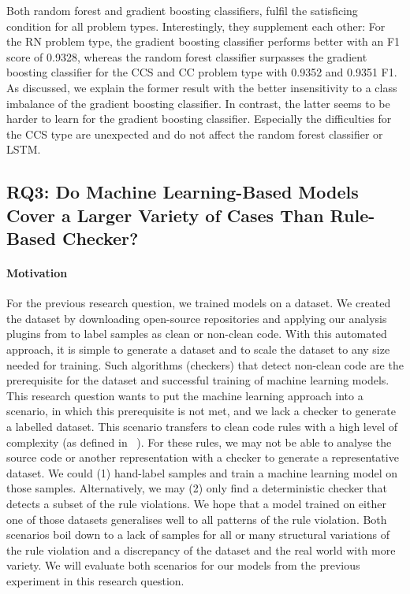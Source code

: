  Both random forest and gradient boosting classifiers, fulfil the satisficing condition for all problem types. Interestingly, they supplement each other: For the RN problem type, the gradient boosting classifier performs better with an F1 score of 0.9328, whereas the random forest classifier surpasses the gradient boosting classifier for the CCS and CC problem type with 0.9352 and 0.9351 F1. As discussed, we explain the former result with the better insensitivity to a class imbalance of the gradient boosting classifier. In contrast, the latter seems to be harder to learn for the gradient boosting classifier. Especially the difficulties for the CCS type are unexpected and do not affect the random forest classifier or LSTM.

\subsection{RQ3: Do Machine Learning-Based Models Cover a Larger Variety of Cases Than Rule-Based Checker? }\label{rq:3}

\paragraph{Motivation}
For the previous research question, we trained models on a dataset. We created the dataset by downloading open-source repositories and applying our analysis plugins from  to label samples as clean or non-clean code. With this automated approach, it is simple to generate a dataset and to scale the dataset to any size needed for training. Such algorithms (checkers) that detect non-clean code are the prerequisite for the dataset and successful training of machine learning models. This research question wants to put the machine learning approach into a scenario, in which this prerequisite is not met, and we lack a checker to generate a labelled dataset. 
This scenario transfers to clean code rules with a high level of complexity (as defined in ~). For these rules, we may not be able to analyse the source code or another representation with a checker to generate a representative dataset. We could (1) hand-label samples and train a machine learning model on those samples. Alternatively, we may (2) only find a deterministic checker that detects a subset of the rule violations. We hope that a model trained on either one of those datasets generalises well to all patterns of the rule violation. Both scenarios boil down to a lack of samples for all or many structural variations of the rule violation and a discrepancy of the dataset and the real world with more variety. We will evaluate both scenarios for our models from the previous experiment in this research question.


